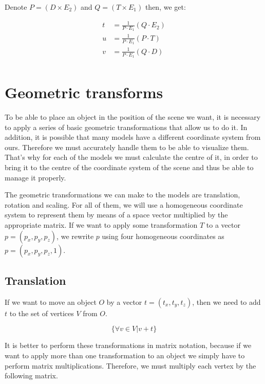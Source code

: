 \documentclass[titlepage,12pt]{report}
\begin{document}
Denote $P = \left( D \times E_2 \right) $ and $Q = \left( T \times E_1 \right)$ then, we get:

\begin{equation}
\begin{split}
t & = \frac{1}{P \cdot E_1} \left(Q \cdot E_2 \right) \\
u & = \frac{1}{P \cdot E_1} \left(P \cdot T \right) \\
v & = \frac{1}{P \cdot E_1} \left(Q \cdot D \right) \\
\end{split}
\end{equation}

\section{Geometric transforms}

To be able to place an object in the position of the scene we want, it is necessary to apply a series of basic geometric transformations that allow us to do it. In addition, it is possible that many models have a different coordinate system from ours. Therefore we must accurately handle them to be able to visualize them. That's why for each of the models we must calculate the centre of it, in order to bring it to the centre of the coordinate system of the scene and thus be able to manage it properly.

The geometric transformations we can make to the models are translation, rotation and scaling. For all of them, we will use a homogeneous coordinate system to represent them by means of a space vector multiplied by the appropriate matrix. If we want to apply some transformation $T$ to a  vector $p = (p_x, p_y, p_z)$, we rewrite $p$ using four homogeneous coordinates as $p = (p_x, p_y, p_z, 1)$.

\subsection{Translation}

If we want to move an object $O$ by a vector $t = (t_x, t_y, t_z)$, then we need to add $t$ to the set of vertices $V$ from $O$.

\begin{equation}
\{\forall v \in V | v + t\}
\end{equation}

It is better to perform these transformations in matrix notation, because if we want to apply more than one transformation to an object we simply have to perform matrix multiplications. Therefore, we must multiply each vertex by the following matrix.
\end{document}
